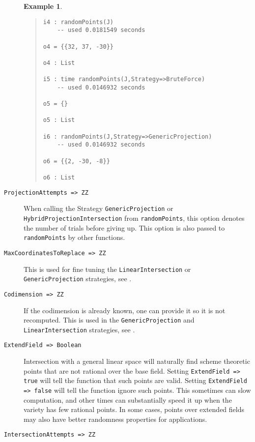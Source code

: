 \documentclass[11pt]{amsart}
\theoremstyle{definition}
\newtheorem{example}{Example}[section]
\begin{document}
\begin{description}
\begin{example}
{\begin{quote}
\begin{verbatim}
i4 : randomPoints(J)
    -- used 0.0181549 seconds

o4 = {{32, 37, -30}}

o4 : List

i5 : time randomPoints(J,Strategy=>BruteForce)
    -- used 0.0146932 seconds

o5 = {}

o5 : List

i6 : randomPoints(J,Strategy=>GenericProjection)
    -- used 0.0146932 seconds

o6 = {{2, -30, -8}}

o6 : List
        \end{verbatim}
    \end{quote}
        }
    \end{example}%
    \vspace{-1em}
    \item[\tt ProjectionAttempts => ZZ] 

    When calling the Strategy {\tt GenericProjection} or \\
    {\tt HybridProjectionIntersection} from {\tt randomPoints}, this option denotes the number of trials before giving up.  This option is also passed to {\tt randomPoints} by other functions.

    \item[\tt MaxCoordinatesToReplace => ZZ] This is used for fine tuning the {\tt LinearIntersection} or {\tt GenericProjection} strategies, see .
    \item[\tt Codimension => ZZ] If the codimension is already known, one can provide it so it is not recomputed.  This is used in the {\tt GenericProjection} and {\tt LinearIntersection} strategies, see .

    \item[\tt ExtendField => Boolean] 

    Intersection with a general linear space will naturally find scheme theoretic points that are not rational over the base field.  
    Setting {\tt ExtendField => true} will tell the function that such points are valid.  Setting {\tt ExtendField => false} will tell the function ignore such points.  This sometimes can slow computation, and other times can substantially speed it up when the variety has few rational points.  In some cases, points over extended fields may also have better randomness properties for applications.


    \item[\tt IntersectionAttempts => ZZ]


\end{description}
\end{document}
